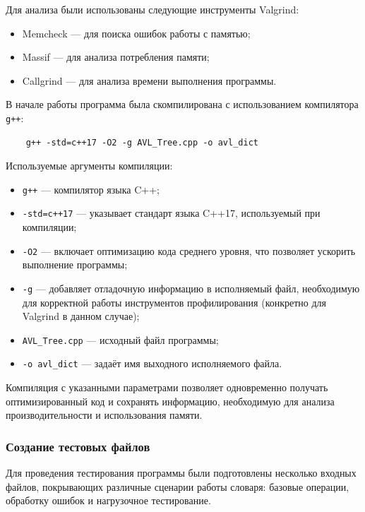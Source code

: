 \documentclass[12pt]{article}
\begin{document}
Для анализа были использованы следующие инструменты Valgrind:
\begin{itemize}
	\item Memcheck — для поиска ошибок работы с памятью;
	\item Massif — для анализа потребления памяти;
	\item Callgrind — для анализа времени выполнения программы.
\end{itemize}

\vspace{1\baselineskip}

В начале работы программа была скомпилирована с использованием компилятора \texttt{g++}:

\begin{verbatim}
	g++ -std=c++17 -O2 -g AVL_Tree.cpp -o avl_dict
\end{verbatim}

Используемые аргументы компиляции:

\begin{itemize}
	\item \texttt{g++} — компилятор языка C++;
	\item \texttt{-std=c++17} — указывает стандарт языка C++17, используемый при компиляции;
	\item \texttt{-O2} — включает оптимизацию кода среднего уровня, что позволяет ускорить выполнение программы;
	\item \texttt{-g} — добавляет отладочную информацию в исполняемый файл, необходимую для корректной работы инструментов профилирования (конкретно для Valgrind в данном случае);
	\item \texttt{AVL\_Tree.cpp} — исходный файл программы;
	\item \texttt{-o avl\_dict} — задаёт имя выходного исполняемого файла.
\end{itemize}

Компиляция с указанными параметрами позволяет одновременно получать оптимизированный код и сохранять информацию, необходимую для анализа производительности и использования памяти.

\vspace{1\baselineskip}

\subsubsection*{Создание тестовых файлов}

Для проведения тестирования программы были подготовлены несколько входных файлов, покрывающих различные сценарии работы словаря: базовые операции, обработку ошибок и нагрузочное тестирование.
\end{document}
